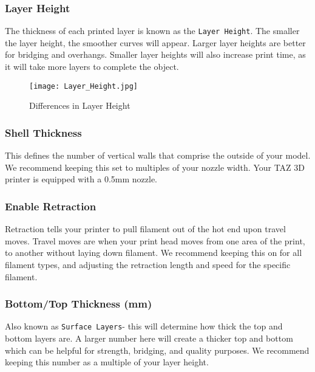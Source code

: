 \subsubsection{Layer Height}
The thickness of each printed layer is known as the \texttt{Layer Height}. The smaller the layer height, the smoother curves will appear. Larger layer heights are better for bridging and overhangs. Smaller layer heights will also increase print time, as it will take more layers to complete the object.
\begin{figure}[H]
\centering
\texttt{[image: Layer\_Height.jpg]}
\caption{Differences in Layer Height}
\label{fig:Differences in Layer Height}
\end{figure}


\subsubsection{Shell Thickness}
This defines the number of vertical walls that comprise the outside of your model. We recommend keeping this set to multiples of your nozzle width. Your TAZ 3D printer is equipped with a 0.5mm nozzle. %

\subsubsection{Enable Retraction}
Retraction tells your printer to pull filament out of the hot end upon travel moves. Travel moves are when your print head moves from one area of the print, to another without laying down filament. We recommend keeping this on for all filament types, and adjusting the retraction length and speed for the specific filament.

\subsubsection{Bottom/Top Thickness (mm)}
Also known as \texttt{Surface Layers}- this will determine how thick the top and bottom layers are. A larger number here will create a thicker top and bottom which can be helpful for strength, bridging, and quality purposes. We recommend keeping this number as a multiple of your layer height.

